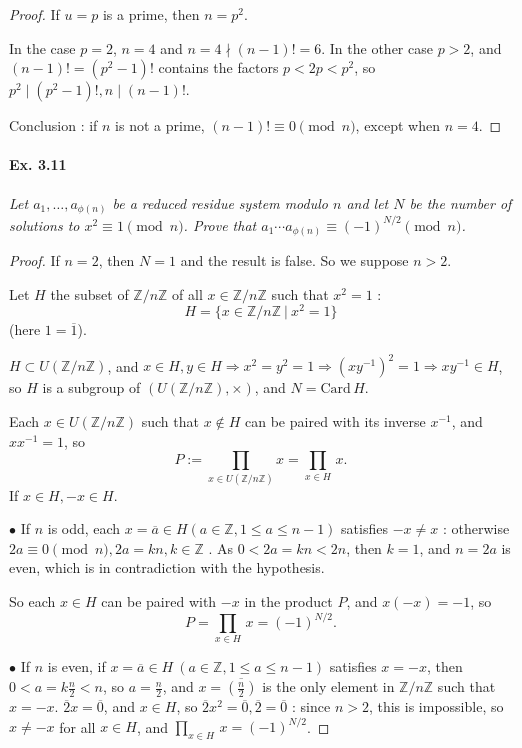\documentclass[11pt,a4paper]{article}
\newcommand{\Z}{\mathbb{Z}}
\begin{document}
{\begin{proof}
If $u = p$ is a prime, then $n =p^2$.

In the case $p = 2$, $n = 4$ and $n=4  \nmid (n-1)! = 6$. In the other case $p >2$, and $(n-1)! = (p^2 - 1)!$ contains the factors $p < 2p < p^2$, so $p^2 \mid (p^2-1)!, n \mid (n-1)!$.

Conclusion : if $n$ is not a prime, $(n - 1)! \equiv 0 \pmod n$, except when $n=4$.

\end{proof}

\paragraph{Ex. 3.11}

{\it Let $a_1, \ldots, a_{\phi(n)}$ be a reduced residue system modulo $n$ and let $N$ be the number of solutions to $x^2 \equiv 1 \pmod n$. Prove that $a_1 \cdots a_{\phi(n)} \equiv (-1)^{N/2} \pmod n$.
}

\begin{proof}
If $n=2$, then $N=1$ and the result is false. So we suppose $n>2$.

Let $H$ the subset of $\Z/n\Z$ of all $x \in \Z/n\Z$ such that $x^2=1$ :
$$H = \{x \in \Z/n\Z\ \vert \ x^2 = 1\}$$
(here $1 = \overline{1}$).

$H \subset U(\Z/n\Z)$, and $x \in H, y \in H \Rightarrow x^2 = y^2=1 \Rightarrow (xy^{-1})^2 = 1 \Rightarrow xy^{-1} \in H$, so $H$ is a subgroup of $(U(\Z/n\Z),\times)$, and $N = \mathrm{Card}\, H$.

Each $x \in U(\Z/n\Z)$ such that $x \not \in H$ can be paired with its inverse $x^{-1}$, and $xx^{-1} = 1$, so
$$P := \prod_{x \in U(\Z/n\Z)} x = \prod_{x\in H} \, x.$$
If $x \in H, -x \in H$.

$\bullet$ If $n$ is odd, each $x = \overline{a}\in H (a\in \Z, 1\leq a \leq n-1)$ satisfies $-x \neq x$ : otherwise $2 a \equiv 0 \pmod n, 2a = k n, k \in \Z$ . As $0<2a = kn  < 2n$, then $k=1$, and $n = 2a$ is even, which is in contradiction with the hypothesis.

So each $x \in H$ can be paired with $-x$ in the product $P$, and $x(-x) = -1$, so
$$P = \prod_{x\in H} \, x = (-1)^{N/2}.$$

$\bullet$ If $n$ is even, if $x = \overline{a}\in H\ (a\in \Z, 1\leq a \leq n-1)$ satisfies $x = -x$, then $0 < a = k \frac{n}{2} < n$, so $a = \frac{n}{2}$, and $x = \overline{ \left(\frac{n}{2}\right)}$ is the only element in $\Z/n\Z$ such that $x = -x$. $\overline{2}x = \overline{0}$, and $x \in H$, so $\overline{2} x^2 = \overline{0}, \overline{2} = \overline{0}$ : since $n>2$, this is impossible, so $x \neq -x$ for all $x \in H$, and $\prod_{x\in H} \, x = (-1)^{N/2}$.


\end{proof}}
\end{document}
